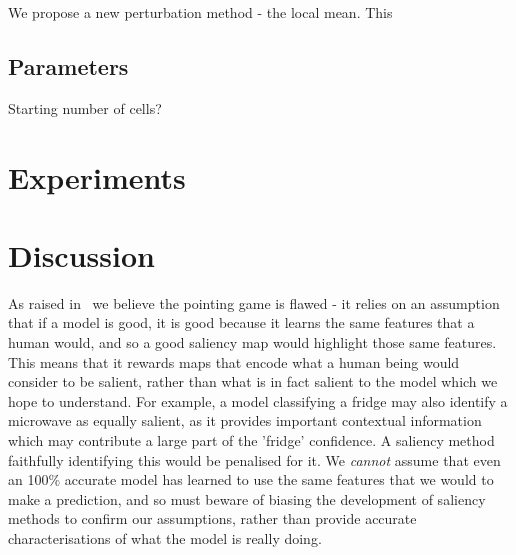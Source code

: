 \documentclass{article} %
\begin{document}
We propose a new perturbation method - the local mean. This 


\subsection{Parameters}

Starting number of cells?

\section{Experiments}

    


    

\section{Discussion}

As raised in~\cite{Zeiler2013-lm} we believe the pointing game is flawed - it relies on an assumption that if a model is good, it is good because it learns the same features that a human would, and so a good saliency map would highlight those same features. This means that it rewards maps that encode what a human being would consider to be salient, rather than what is in fact salient to the model which we hope to understand. For example, a model classifying a fridge may also identify a microwave as equally salient, as it provides important contextual information which may contribute a large part of the 'fridge' confidence. A saliency method faithfully identifying this would be penalised for it. We \emph{cannot} assume that even an 100\% accurate model has learned to use the same features that we would to make a prediction, and so must beware of biasing the development of saliency methods to confirm our assumptions, rather than provide accurate characterisations of what the model is really doing.
\end{document}
